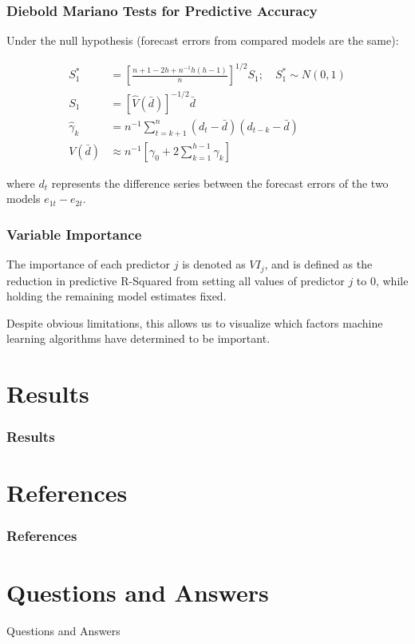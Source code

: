 \documentclass[]{beamer}
\begin{document}
\begin{frame}
\frametitle{Diebold Mariano Tests for Predictive Accuracy}
Under the null hypothesis (forecast errors from compared models are the same):

\begin{align}
S_1^* &= \left[ 
\frac{n + 1 - 2h + n^{-1}h(h-1)}
{n} 
\right]^{1/2}S_1 ; \quad S_1^* \sim N(0,1)\\
S_1 &= \left[ 
\hat{V}(\bar{d})
\right] ^{-1/2}\bar{d} \\
\hat{\gamma}_k &= n^{-1} \sum_{t = k + 1}^{n}(d_t - \bar{d})(d_{t-k} - \bar{d}) \\
V(\bar{d}) &\approx n^{-1}\left[ 
\gamma_0 + 2 \sum_{k = 1}^{h - 1}\gamma_k
\right] 
\end{align}

where $d_t$ represents the difference series between the forecast errors of the two models $e_{1t} - e_{2t}$.
\end{frame}

\begin{frame}
\frametitle{Variable Importance}
The importance of each predictor $j$ is denoted as $VI_j$, and is defined as the reduction in predictive R-Squared from setting all values of predictor $j$ to 0, while holding the remaining model estimates fixed. 

Despite obvious limitations, this allows us to visualize which factors machine learning algorithms have determined to be important.
\end{frame}

\section{Results}

\begin{frame}
\frametitle{Results}

\end{frame}

\section{References}
\begin{frame}
\frametitle{References}


\end{frame}

\section{Questions and Answers}

\begin{frame}
\begin{center}
\huge Questions and Answers
\end{center}
\end{frame}
\end{document}

